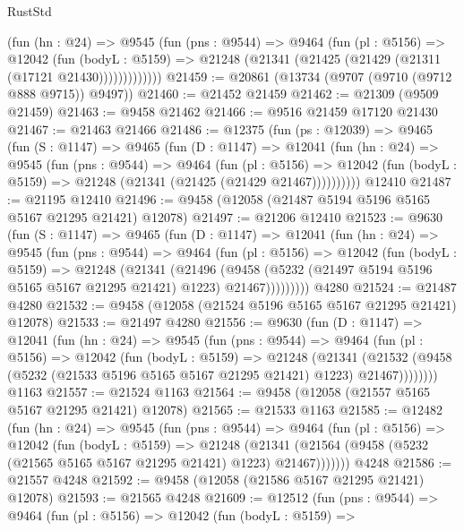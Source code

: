\begin{lexlean}{RustStd}
\begin{coremodule}
            (fun (hn : @24) =>
            @9545
              (fun (pns : @9544) =>
              @9464
                (fun (pl : @5156) =>
                @12042
                  (fun (bodyL : @5159) =>
                  @21248 (@21341 (@21425 (@21429 (@21311 (@17121 @21430)))))))))))))
@21459 := @20861 (@13734 (@9707 (@9710 (@9712 @888 @9715)) @9497))
@21460 := @21452 @21459
@21462 := @21309 (@9509 @21459)
@21463 := @9458 @21462
@21466 := @9516 @21459 @17120 @21430
@21467 := @21463 @21466
@21486 := @12375
    (fun (ps : @12039) =>
    @9465
      (fun (S : @1147) =>
      @9465
        (fun (D : @1147) =>
        @12041
          (fun (hn : @24) =>
          @9545
            (fun (pns : @9544) =>
            @9464
              (fun (pl : @5156) =>
              @12042 (fun (bodyL : @5159) => @21248 (@21341 (@21425 (@21429 @21467))))))))))
    @12410
@21487 := @21195 @12410
@21496 := @9458 (@12058 (@21487 @5194 @5196 @5165 @5167 @21295 @21421) @12078)
@21497 := @21206 @12410
@21523 := @9630
    (fun (S : @1147) =>
    @9465
      (fun (D : @1147) =>
      @12041
        (fun (hn : @24) =>
        @9545
          (fun (pns : @9544) =>
          @9464
            (fun (pl : @5156) =>
            @12042
              (fun (bodyL : @5159) =>
              @21248
                (@21341
                  (@21496
                    (@9458
                      (@5232 (@21497 @5194 @5196 @5165 @5167 @21295 @21421) @1223)
                      @21467)))))))))
    @4280
@21524 := @21487 @4280
@21532 := @9458 (@12058 (@21524 @5196 @5165 @5167 @21295 @21421) @12078)
@21533 := @21497 @4280
@21556 := @9630
    (fun (D : @1147) =>
    @12041
      (fun (hn : @24) =>
      @9545
        (fun (pns : @9544) =>
        @9464
          (fun (pl : @5156) =>
          @12042
            (fun (bodyL : @5159) =>
            @21248
              (@21341
                (@21532 (@9458 (@5232 (@21533 @5196 @5165 @5167 @21295 @21421) @1223) @21467))))))))
    @1163
@21557 := @21524 @1163
@21564 := @9458 (@12058 (@21557 @5165 @5167 @21295 @21421) @12078)
@21565 := @21533 @1163
@21585 := @12482
    (fun (hn : @24) =>
    @9545
      (fun (pns : @9544) =>
      @9464
        (fun (pl : @5156) =>
        @12042
          (fun (bodyL : @5159) =>
          @21248
            (@21341 (@21564 (@9458 (@5232 (@21565 @5165 @5167 @21295 @21421) @1223) @21467)))))))
    @4248
@21586 := @21557 @4248
@21592 := @9458 (@12058 (@21586 @5167 @21295 @21421) @12078)
@21593 := @21565 @4248
@21609 := @12512
    (fun (pns : @9544) =>
    @9464
      (fun (pl : @5156) =>
      @12042
        (fun (bodyL : @5159) =>

\end{coremodule}
\end{lexlean}
